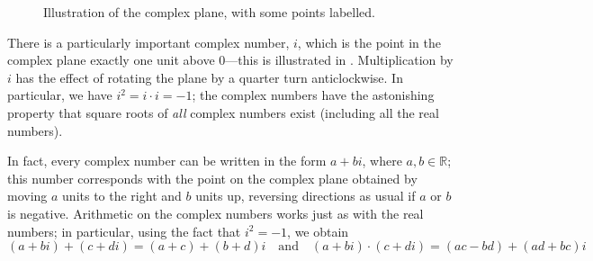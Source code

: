 \begin{figure}[p!]
\centering
{}
\caption{Illustration of the complex plane, with some points labelled.}
\label{figComplexNumbers}
\end{figure}

There is a particularly important complex number, $i$, which is the point in the complex plane exactly one unit above $0$---this is illustrated in . Multiplication by $i$ has the effect of rotating the plane by a quarter turn anticlockwise. In particular, we have $i^2 = i \cdot i = -1$; the complex numbers have the astonishing property that square roots of \textit{all} complex numbers exist (including all the real numbers).

In fact, every complex number can be written in the form $a+bi$, where $a,b \in \mathbb{R}$; this number corresponds with the point on the complex plane obtained by moving $a$ units to the right and $b$ units up, reversing directions as usual if $a$ or $b$ is negative. Arithmetic on the complex numbers works just as with the real numbers; in particular, using the fact that $i^2=-1$, we obtain
\[ (a+bi)+(c+di) = (a+c)+(b+d)i \quad \text{and} \quad (a+bi) \cdot (c+di) = (ac-bd) + (ad+bc)i \]

